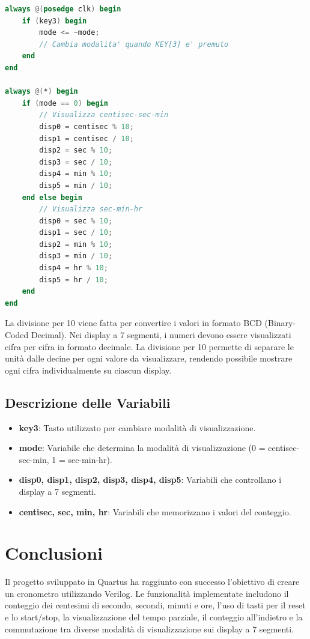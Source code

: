 \documentclass{article}
\begin{document}
\begin{lstlisting}[language=Verilog, caption={Gestione delle Modalità di Visualizzazione}]
always @(posedge clk) begin
    if (key3) begin
        mode <= ~mode; 
        // Cambia modalita' quando KEY[3] e' premuto
    end
end

always @(*) begin
    if (mode == 0) begin
        // Visualizza centisec-sec-min
        disp0 = centisec % 10;
        disp1 = centisec / 10;
        disp2 = sec % 10;
        disp3 = sec / 10;
        disp4 = min % 10;
        disp5 = min / 10;
    end else begin
        // Visualizza sec-min-hr
        disp0 = sec % 10;
        disp1 = sec / 10;
        disp2 = min % 10;
        disp3 = min / 10;
        disp4 = hr % 10;
        disp5 = hr / 10;
    end
end
\end{lstlisting}

\newpage

La divisione per 10 viene fatta per convertire i valori in formato BCD (Binary-Coded Decimal). Nei display a 7 segmenti, i numeri devono essere visualizzati cifra per cifra in formato decimale. La divisione per 10 permette di separare le unità dalle decine per ogni valore da visualizzare, rendendo possibile mostrare ogni cifra individualmente su ciascun display.

\subsection{Descrizione delle Variabili}
\begin{itemize}
    \item \textbf{key3}: Tasto utilizzato per cambiare modalità di visualizzazione.
    \item \textbf{mode}: Variabile che determina la modalità di visualizzazione (0 = centisec-sec-min, 1 = sec-min-hr).
    \item \textbf{disp0, disp1, disp2, disp3, disp4, disp5}: Variabili che controllano i display a 7 segmenti.
    \item \textbf{centisec, sec, min, hr}: Variabili che memorizzano i valori del conteggio.
\end{itemize}

\newpage

\section{Conclusioni}

Il progetto sviluppato in Quartus ha raggiunto con successo l'obiettivo di creare un cronometro utilizzando Verilog. Le funzionalità implementate includono il conteggio dei centesimi di secondo, secondi, minuti e ore, l'uso di tasti per il reset e lo start/stop, la visualizzazione del tempo parziale, il conteggio all'indietro e la commutazione tra diverse modalità di visualizzazione sui display a 7 segmenti.
\end{document}
